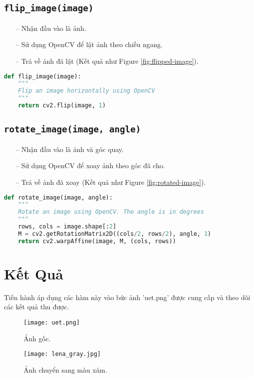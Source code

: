 \documentclass{article}
\begin{document}
\subsection{\texttt{flip\_image(image)}}
\begin{itemize}
    \item[--] Nhận đầu vào là ảnh.
    \item[--] Sử dụng OpenCV để lật ảnh theo chiều ngang.
    \item[--] Trả về ảnh đã lật (Kết quả như Figure  \ref{fig:flipped-image}).
\end{itemize}
\begin{lstlisting}[language=Python]
def flip_image(image):
    """
    Flip an image horizontally using OpenCV
    """
    return cv2.flip(image, 1)
\end{lstlisting}

\subsection{\texttt{rotate\_image(image, angle)}}
\begin{itemize}
    \item[--] Nhận đầu vào là ảnh và góc quay.
    \item[--] Sử dụng OpenCV để xoay ảnh theo góc đã cho.
    \item[--] Trả về ảnh đã xoay (Kết quả như Figure  \ref{fig:rotated-image}).
\end{itemize}
\begin{lstlisting}[language=Python]
def rotate_image(image, angle):
    """
    Rotate an image using OpenCV. The angle is in degrees
    """
    rows, cols = image.shape[:2]
    M = cv2.getRotationMatrix2D((cols/2, rows/2), angle, 1)
    return cv2.warpAffine(image, M, (cols, rows))
\end{lstlisting}

\vspace{20pt}
\section{Kết Quả}
Tiến hành áp dụng các hàm này vào bức ảnh 'uet.png' được cung cấp và theo dõi các kết quả thu được.

\begin{figure}[htbp]
    \begin{minipage}[t]{0.5\textwidth}
        \centering
        \texttt{[image: uet.png]}
        \caption{Ảnh gốc.}
        \label{fig:original-image}
    \end{minipage}%
    \begin{minipage}[t]{0.5\textwidth}
        \centering
        \texttt{[image: lena\_gray.jpg]}
        \caption{Ảnh chuyển sang màu xám.}
        \label{fig:grayscale-image}
    \end{minipage}
\end{figure}
\end{document}
